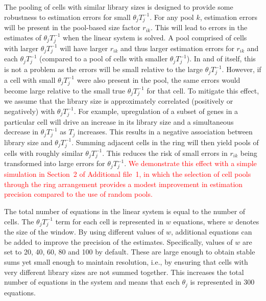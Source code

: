 \documentclass{bmcart}
\newcommand{\supppoolsim}{2}
\newcommand{\revised}[1]{\textcolor{red}{#1}}
\begin{document}
The pooling of cells with similar library sizes is designed to provide some robustness to estimation errors for small $\theta_j T_j^{-1}$.
For any pool $k$, estimation errors will be present in the pool-based size factor $r_{ik}$.
This will lead to errors in the estimates of $\theta_j T_j^{-1}$ when the linear system is solved.
A pool comprised of cells with larger $\theta_j T_j^{-1}$ will have larger $r_{ik}$ and thus larger estimation errors for $r_{ik}$ and each $\theta_j T_j^{-1}$ (compared to a pool of cells with smaller $\theta_j T_j^{-1}$).
In and of itself, this is not a problem as the errors will be small relative to the large $\theta_j T_j^{-1}$.
However, if a cell with small $\theta_j T_j^{-1}$ were also present in the pool, the same errors would become large relative to the small true $\theta_j T_j^{-1}$ for that cell.
To mitigate this effect, we assume that the library size is approximately correlated (positively or negatively) with $\theta_j T_j^{-1}$.
For example, upregulation of a subset of genes in a particular cell will drive an increase in its library size and a simultaneous decrease in $\theta_j T_j^{-1}$ as $T_j$ increases.
This results in a negative association between library size and $\theta_j T_j^{-1}$.
Summing adjacent cells in the ring will then yield pools of cells with roughly similar $\theta_j T_j^{-1}$.
This reduces the risk of small errors in $r_{ik}$ being transformed into large errors for $\theta_j T_j^{-1}$.
\revised{We demonstrate this effect with a simple simulation in Section~\supppoolsim{} of Additional file~1, in which the selection of cell pools through the ring arrangement provides a modest improvement in estimation precision compared to the use of random pools.}

The total number of equations in the linear system is equal to the number of cells.
The $\theta_jT_j^{-1}$ term for each cell is represented in $w$ equations, where $w$ denotes the size of the window.
By using different values of $w$, additional equations can be added to improve the precision of the estimates. 
Specifically, values of $w$ are set to 20, 40, 60, 80 and 100 by default.
These are large enough to obtain stable sums yet small enough to maintain resolution, i.e., by ensuring that cells with very different library sizes are not summed together.
This increases the total number of equations in the system and means that each $\theta_j$ is represented in 300 equations. 
\end{document}
